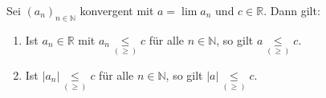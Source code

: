 Sei $(a_n)_{n \in \mathbb{N}}$ konvergent mit $a = \lim a_n$ und $c \in \mathbb{R}$. Dann gilt:
\begin{enumerate}[label=\alph*)]
    \item Ist $a_n \in \mathbb{R}$ mit $a_n \underset{(\geq)}{\leq} c$ für alle $n \in \mathbb{N}$, so gilt $a \underset{(\geq)}{\leq} c$.
    \item Ist $|a_n| \underset{(\geq)}{\leq} c$ für alle $n \in \mathbb{N}$, so gilt $|a| \underset{(\geq)}{\leq} c$.
\end{enumerate}